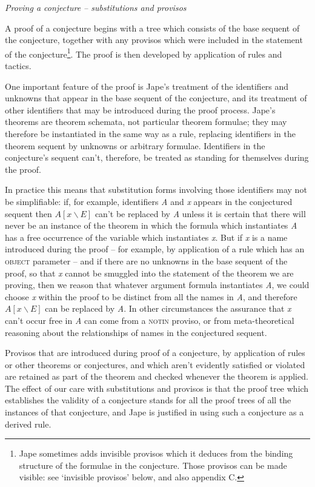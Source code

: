 \documentclass[11pt]{book}
\begin{document}
\textit{Proving a conjecture -- substitutions and provisos}


A proof of a conjecture begins with a tree which consists of the base sequent of the conjecture, together with any provisos which were included in the statement of the conjecture\footnote{Jape sometimes adds invisible provisos which it deduces from the binding structure of the formulae in the conjecture. Those provisos can be made visible: see `invisible provisos' below, and also appendix C.}. The proof is then developed by application of rules and tactics.


One important feature of the proof is Jape's treatment of the identifiers and unknowns that appear in the base sequent of the conjecture, and its treatment of other identifiers that may be introduced during the proof process. Jape's theorems are theorem schemata, not particular theorem formulae; they may therefore be instantiated in the same way as a rule, replacing identifiers in the theorem sequent by unknowns or arbitrary formulae. Identifiers in the conjecture's sequent can't, therefore, be treated as standing for themselves during the proof.


In practice this means that substitution forms involving those identifiers may not be simplifiable: if, for example, identifiers \textit{A} and \textit{x} appears in the conjectured sequent then $A[x\backslash E]$ can't be replaced by \textit{A} unless it is certain that there will never be an instance of the theorem in which the formula which instantiates \textit{A} has a free occurrence of the variable which instantiates \textit{x}. But if \textit{x} is a name introduced during the proof -- for example, by application of a rule which has an \textsc{object} parameter -- and if there are no unknowns in the base sequent of the proof, so that \textit{x} cannot be smuggled into the statement of the theorem we are proving, then we reason that whatever argument formula instantiates \textit{A}, we could choose \textit{x} within the proof to be distinct from all the names in \textit{A}, and therefore $A[x\backslash E]$ can be replaced by \textit{A}. In other circumstances the assurance that \textit{x} can't occur free in \textit{A} can come from a \textsc{notin} proviso, or from meta-theoretical reasoning about the relationships of names in the conjectured sequent.


Provisos that are introduced during proof of a conjecture, by application of rules or other theorems or conjectures, and which aren't evidently satisfied or violated are retained as part of the theorem and checked whenever the theorem is applied.\\
The effect of our care with substitutions and provisos is that the proof tree which establishes the validity of a conjecture stands for all the proof trees of all the instances of that conjecture, and Jape is justified in using such a conjecture as a derived rule.
\end{document}

